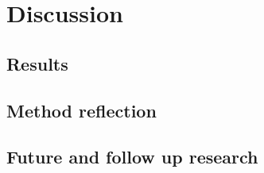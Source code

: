 \chapter{Discussion}
\section{Results}
\section{Method reflection}
\section{Future and follow up research}
